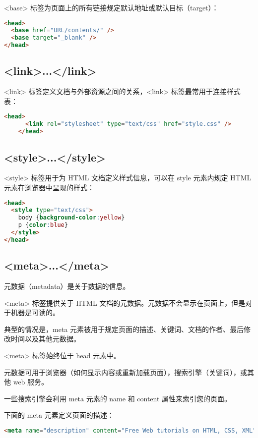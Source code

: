 <base> 标签为页面上的所有链接规定默认地址或默认目标（target）：

\begin{lstlisting}[language=HTML]
<head>
  <base href="URL/contents/" />
  <base target="_blank" />
</head>
\end{lstlisting}


\subsection{<link>...</link>}

<link> 标签定义文档与外部资源之间的关系，<link> 标签最常用于连接样式表：

\begin{lstlisting}[language=HTML]
    <head>
      <link rel="stylesheet" type="text/css" href="style.css" />
    </head>
\end{lstlisting}

\subsection{<style>...</style>}

<style> 标签用于为 HTML 文档定义样式信息，可以在 style 元素内规定 HTML 元素在浏览器中呈现的样式：

\begin{lstlisting}[language=HTML]
<head>
  <style type="text/css">
    body {background-color:yellow}
    p {color:blue}
  </style>
</head>
\end{lstlisting}


\subsection{<meta>...</meta>}

元数据（metadata）是关于数据的信息。

<meta> 标签提供关于 HTML 文档的元数据。元数据不会显示在页面上，但是对于机器是可读的。

典型的情况是，meta 元素被用于规定页面的描述、关键词、文档的作者、最后修改时间以及其他元数据。

<meta> 标签始终位于 head 元素中。

元数据可用于浏览器（如何显示内容或重新加载页面），搜索引擎（关键词），或其他 web 服务。


一些搜索引擎会利用 meta 元素的 name 和 content 属性来索引您的页面。

下面的 meta 元素定义页面的描述：

\begin{lstlisting}[language=HTML]
  <meta name="description" content="Free Web tutorials on HTML, CSS, XML" />
\end{lstlisting}


